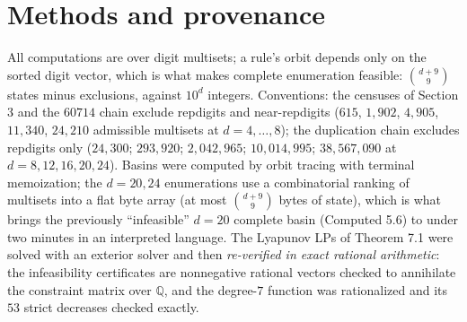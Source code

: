 \documentclass[11pt,letterpaper]{article}
\theoremstyle{paperstyle}
\theoremstyle{paperstyledef}
\theoremstyle{paperstylerem}
\begin{document}
\section{Methods and provenance}\label{methods-and-provenance}

All computations are over digit multisets; a rule's orbit depends only on the sorted digit vector, which is what makes complete enumeration feasible: \(\binom{d+9}{9}\) states minus exclusions, against \(10^d\) integers. Conventions: the censuses of Section 3 and the \(60714\) chain exclude repdigits and near-repdigits (\(615\), \(1{,}902\), \(4{,}905\), \(11{,}340\), \(24{,}210\) admissible multisets at \(d = 4, \dots, 8\)); the duplication chain excludes repdigits only (\(24{,}300\); \(293{,}920\); \(2{,}042{,}965\); \(10{,}014{,}995\); \(38{,}567{,}090\) at \(d = 8, 12, 16, 20, 24\)). Basins were computed by orbit tracing with terminal memoization; the \(d = 20, 24\) enumerations use a combinatorial ranking of multisets into a flat byte array (at most \(\binom{d+9}{9}\) bytes of state), which is what brings the previously ``infeasible'' \(d = 20\) complete basin (Computed 5.6) to under two minutes in an interpreted language. The Lyapunov LPs of Theorem 7.1 were solved with an exterior solver and then \emph{re-verified in exact rational arithmetic}: the infeasibility certificates are nonnegative rational vectors checked to annihilate the constraint matrix over \(\mathbb{Q}\), and the degree-\(7\) function was rationalized and its \(53\) strict decreases checked exactly.
\end{document}
